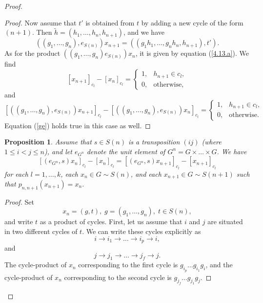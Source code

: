 \documentclass[10pt,a4paper]{amsart}
\newtheorem{prop}{Proposition}
\begin{document}
\begin{proof}
\begin{proof}
Now assume that $t'$  is obtained from $t$ by adding a new cycle of the form $(n+1)$. Then
$\tilde{h}=\left(h_1,\ldots,h_n,h_{n+1}\right)$, and we have
$$
\left(\left(g_1,\ldots,g_n\right),e_{S(n)}\right)x_{n+1}
=\left(\left(g_1h_1,\ldots,g_nh_n,h_{n+1}\right),t'\right).
$$
As for the product $\left(\left(g_1,\ldots,g_n\right)e_{S(n)}\right)x_n$, it is given by equation (\ref{4.13.a}).
We find
$$
\left[x_{n+1}\right]_{c_l}-\left[x_n\right]_{c_l}=
 \left\{
 \begin{array}{ll}
 1, & h_{n+1}\in c_l, \\
 0, & \mbox{otherwise},
\end{array}
\right.
$$
and
$$
\left[\left(\left(g_1,\ldots,g_n\right),e_{S(n)}\right)x_{n+1}\right]_{c_l}
-\left[\left(\left(g_1,\ldots,g_n\right),e_{S(n)}\right)x_n\right]_{c_l}=
 \left\{
 \begin{array}{ll}
 1, & h_{n+1}\in c_l, \\
 0, & \mbox{otherwise}.
\end{array}
\right.
$$
Equation (\ref{ge}) holds true in this case as well.
\end{proof}
\begin{prop}\label{PROPOSITIONCoW2} Assume that $s\in S(n)$ is a transposition $(ij)$ (where $1\leq i<j\leq n$), and let $e_{G^{n}}$ denote the unit element of $G^n=G\times\ldots\times G$. We have
\begin{equation}\label{3.3.13}
\left[\left(e_{G^n},s\right)x_n\right]_{c_l}-\left[x_n\right]_{c_l}
=\left[\left(e_{G^n},s\right)x_{n+1}\right]_{c_l}-\left[x_{n+1}\right]_{c_l}
\end{equation}
for each $l=1,\ldots,k$, each $x_n\in G\sim S(n)$, and each $x_{n+1}\in G\sim S(n+1)$ such that $p_{n,n+1}\left(x_{n+1}\right)=x_n$.
\end{prop}
\begin{proof}Set
$$
x_n=\left(g,t\right),\; g=\left(g_1,\ldots,g_n\right),\; t\in S(n),
$$
and write $t$ as a product of cycles. First, let us assume that $i$ and $j$ are situated in two different cycles of $t$.
We can write these cycles explicitly as
\begin{equation}\label{3.3.14}
i\rightarrow i_1\rightarrow\ldots\rightarrow i_p\rightarrow i,
\end{equation}
and
\begin{equation}\label{3.3.15}
j\rightarrow j_1\rightarrow\ldots\rightarrow j_f\rightarrow j.
\end{equation}
The cycle-product of $x_n$ corresponding to the first cycle is $g_{i_p}\ldots g_{i_1}g_i$, and the cycle-product of $x_n$ corresponding to the second cycle is $g_{j_f}\ldots g_{j_1}g_{j}$.


\end{proof}
\end{proof}
\end{document}
